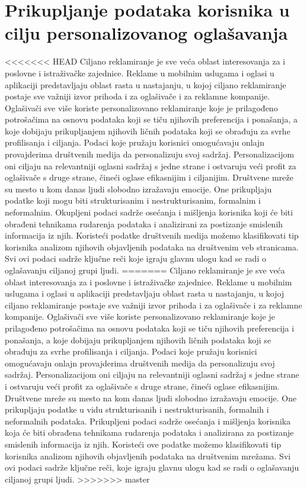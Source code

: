 \documentclass[a4paper]{article}
\begin{document}
	\section{Prikupljanje podataka korisnika u cilju personalizovanog oglašavanja}
	\label{sec:podaci}
<<<<<<< HEAD
	Ciljano reklamiranje je sve veća oblast interesovanja za i poslovne i istraživačke zajednice. Reklame u mobilnim uslugama i oglasi u aplikaciji predstavljaju oblast rasta u nastajanju, u kojoj ciljano reklamiranje postaje sve važniji izvor prihoda i za oglašivače i za reklamne kompanije. Oglašivači sve više koriste personalizovano reklamiranje koje je prilagođeno potrošačima na osnovu podataka koji se tiču njihovih preferencija i ponašanja, a koje dobijaju prikupljanjem njihovih ličnih podataka koji se obrađuju za svrhe profilisanja i ciljanja. Podaci koje pružaju korisnici omogućavaju onlajn provajderima društvenih medija da personalizuju svoj sadržaj. Personalizacijom oni ciljaju na relevantniji oglasni sadržaj s jedne strane i ostvaruju veći profit za oglašivače s druge strane, čineći oglase efikasnijim i ciljanijim.
	Društvene mreže su mesto u kom danas ljudi slobodno izražavaju emocije. One prikupljaju podatke koji mogu biti strukturisanim i nestrukturisanim, formalnim i neformalnim. Okupljeni podaci sadrže osećanja i mišljenja korisnika koji će biti obrađeni tehnikama rudarenja podataka i analizirani za postizanje smislenih informacija iz njih. Koristeći podatke društvenih medija možemo klasifikovati tip korisnika analizom njihovih objavljenih podataka na društvenim veb stranicama. Svi ovi podaci sadrže ključne reči koje igraju glavnu ulogu kad se radi o oglašavanju ciljanoj grupi ljudi.
=======
	Ciljano reklamiranje je sve veća oblast interesovanja za i poslovne i istraživačke zajednice. Reklame u mobilnim uslugama i oglasi u aplikaciji predstavljaju oblast rasta u nastajanju, u kojoj ciljano reklamiranje postaje sve važniji izvor prihoda i za oglašivače i za reklamne kompanije. Oglašivači sve više koriste personalizovano reklamiranje koje je prilagođeno potrošačima na osnovu podataka koji se tiču njihovih preferencija i ponašanja, a koje dobijaju prikupljanjem njihovih ličnih podataka koji se obrađuju za svrhe profilisanja i ciljanja. Podaci koje pružaju korisnici omogućavaju onlajn provajderima društvenih medija da personalizuju svoj sadržaj. Personalizacijom oni ciljaju na relevantniji oglasni sadržaj s jedne strane i ostvaruju veći profit za oglašivače s druge strane, čineći oglase efikasnijim.
	Društvene mreže su mesto na kom danas ljudi slobodno izražavaju emocije. One prikupljaju podatke u vidu strukturisanih i nestrukturisanih, formalnih i neformalnih podataka. Prikupljeni podaci sadrže osećanja i mišljenja korisnika koja će biti obrađena tehnikama rudarenja podataka i analizirana za postizanje smislenih informacija iz njih. Koristeći ove podatke možemo klasifikovati tip korisnika analizom njihovih objavljenih podataka na društvenim mrežama. Svi ovi podaci sadrže ključne reči, koje igraju glavnu ulogu kad se radi o oglašavanju ciljanoj grupi ljudi.
>>>>>>> master
	
\end{document}
